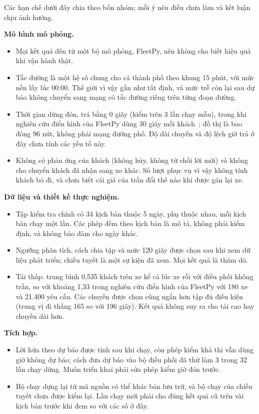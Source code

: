 Các hạn chế dưới đây chia theo bốn nhóm; mỗi ý nêu điều chưa làm và kết luận chịu ảnh hưởng.

\textbf{Mô hình mô phỏng.}
\begin{itemize}[leftmargin=1.2cm,itemsep=2pt,topsep=3pt]
\item Mọi kết quả đến từ một bộ mô phỏng, FleetPy, nên không cho biết hiệu quả khi vận hành thật.
\item Tắc đường là một hệ số chung cho cả thành phố theo khung 15 phút, với mức nền lấy lúc 00:00. Thế giới vì vậy
gần như tất định, và mức trễ còn lại sau dự báo không chuyển sang mạng có tắc đường riêng trên từng đoạn đường.
\item Thời gian dừng đón, trả bằng 0 giây (kiểm trên 3 lần chạy mẫu), trong khi nghiên cứu điển hình của FleetPy dùng
30 giây mỗi khách~\cite{engelhardt2026}; đồ thị là bao đóng 96 nút, không phải mạng đường phố. Độ dài chuyến và độ
lệch giờ trả ở đây chưa tính các yếu tố này.
\item Không có phản ứng của khách (không hủy, không từ chối lời mời) và không cho chuyển khách đã nhận sang xe khác.
Số lượt phục vụ vì vậy không tính khách bỏ đi, và chưa biết cái giá của trần đổi thế nào khi được gán lại xe.
\end{itemize}

\textbf{Dữ liệu và thiết kế thực nghiệm.}
\begin{itemize}[leftmargin=1.2cm,itemsep=2pt,topsep=3pt]
\item Tập kiểm tra chính có 34 kịch bản thuộc 5 ngày, phụ thuộc nhau, mỗi kịch bản chạy một lần. Các phép đếm theo
kịch bản là mô tả, không phải kiểm định, và không bảo đảm cho ngày khác.
\item Ngưỡng phân tích, cách chia tập và mức 120 giây được chọn sau khi xem dữ liệu phát triển; chiều tuyết là một
sự kiện đã xem. Mọi kết quả là thăm dò.
\item Tải thấp: trung bình 0,535 khách trên xe kể cả lúc xe rỗi với điều phối không trần, so với khoảng 1,33 trong
nghiên cứu điển hình của FleetPy với 180 xe và 21.400 yêu cầu. Các chuyến được chọn cũng ngắn hơn tập đủ điều kiện
(trung vị đi thẳng 165 so với 196 giây). Kết quả không suy ra cho tải cao hay chuyến dài hơn.
\end{itemize}

\textbf{Tích hợp.}
\begin{itemize}[leftmargin=1.2cm,itemsep=2pt,topsep=3pt]
\item Lời hứa theo dự báo được tính sau khi chạy, còn phép kiểm khả thi vẫn dùng giờ không dự báo; cách đưa dự báo
vào bộ điều phối đã thử làm 3 trong 32 lần chạy dừng. Muốn triển khai phải sửa phép kiểm giờ đón trước.
\item Bộ chạy dựng lại từ mã nguồn có thể khác bản lưu trữ, và bộ chạy của chiều tuyết chưa được kiểm lại. Lần chạy
mới phải cho đúng kết quả cũ trên vài kịch bản trước khi đem so với các số ở đây.
\end{itemize}

